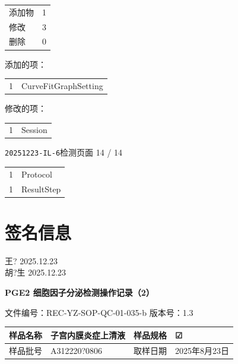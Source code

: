 \documentclass[UTF8,10pt,a4paper,fontset=fandol]{ctexart}
\newcommand{\fieldvalue}[1]{#1}
\newcommand{\handwritten}[1]{#1}
\newcommand{\checkboxfield}[1]{\ifstrequal{#1}{checked}{☑}{\ifstrequal{#1}{unclear}{?}{☐}}}
\begin{document}
\medskip
\begin{tabular}{@{}ll@{}}
添加物 & 1\\
修改 & 3\\
删除 & 0\\
\end{tabular}

\medskip
添加的项：

\begin{tabular}{@{}rl@{}}
1 & CurveFitGraphSetting\\
\end{tabular}

\medskip
修改的项：

\begin{tabular}{@{}rl@{}}
1 & Session\\
\end{tabular}

\newpage

\noindent\texttt{20251223-IL-6}检测\hfill 页面 14 / 14

\noindent
\begin{tabular}{@{}ll@{}}
1 & Protocol\\
1 & ResultStep
\end{tabular}

\section*{签名信息}

\vfill

\begin{flushright}
\handwritten{王?}\quad
\handwritten{2025.12.23}\\[0.5em]
\handwritten{胡?生}\quad
\handwritten{2025.12.23}
\end{flushright}

\newpage

\begin{center}
\textbf{PGE2 细胞因子分泌检测操作记录（2）}
\end{center}

\noindent
文件编号：REC-YZ-SOP-QC-01-035-b \qquad 版本号：1.3

\begin{tabular}{|p{2.4cm}|p{5.0cm}|p{2.4cm}|p{5.0cm}|}
\hline
样品名称 &
\fieldvalue{\handwritten{子宫内膜炎症上清液}} &
样品规格 &
\fieldvalue{\checkboxfield{checked}}
\\ \hline
样品批号 &
\fieldvalue{\handwritten{A312220?0806}} &
取样日期 &
\fieldvalue{\handwritten{2025年8月23日}}
\\ \hline
\end{tabular}
\end{document}
